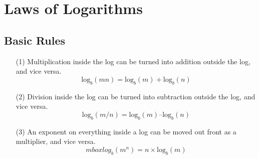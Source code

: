 \documentclass[a4paper,12pt]{article}
\begin{document}


\section*{Laws of Logarithms}
\subsection*{Basic Rules}
\begin{itemize}
\item[(1)] Multiplication inside the log can be turned into addition outside the log, and vice versa.
\[\mbox{log}_b(mn) = \mbox{log}_b(m) + \mbox{log}_b(n)\]

\item[(2)]  Division inside the log can be turned into subtraction outside the log, and vice versa.
\[\mbox{log}_b(m/n) = \mbox{log}_b(m) – \mbox{log}_b(n)\]

\item[(3)] An exponent on everything inside a log can be moved out front as a multiplier, and vice versa.
\[mbox{log}_b(m^n) = n \times \mbox{log}_b(m)\]
\end{itemize}
\end{document}
